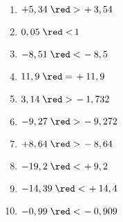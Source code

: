     \ \\ [-7mm]
    {\baselineskip=7mm
    \begin{multicols}{2}
      \begin{enumerate}
         \item $+5,34 \; {\red >} \, +3,54$
         \item $0,05 \; {\red <} \, 1$
         \item $-8,51 \; {\red <} \, -8,5$
         \item $11,9 \; {\red =} \, +11,9$
         \item $3,14 \; {\red >} \, -1,732$
         \item $-9,27 \; {\red >} \, -9,272$
         \item $+8,64 \; {\red >} \, -8,64$
         \item $-19,2 \; {\red <} \, +9,2$
         \item $-14,39 \; {\red <} \, +14,4$
         \item $-0,99 \; {\red <} \, -0,909$
      \end{enumerate}
   \end{multicols}
   }
